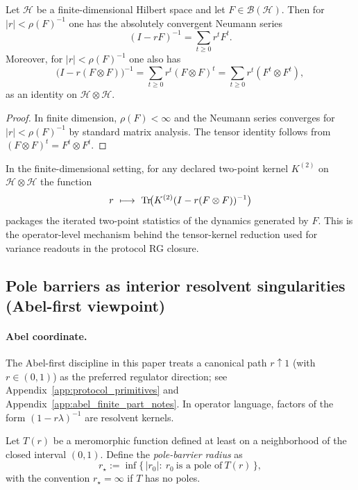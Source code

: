 \begin{lemma}\label{lem:tensor_resolvent_neumann}
\MathTag Let $\mathcal{H}$ be a finite-dimensional Hilbert space and let $F\in\mathcal{B}(\mathcal{H})$.
Then for $|r|<\rho(F)^{-1}$ one has the absolutely convergent Neumann series
\[
(I-rF)^{-1}=\sum_{t\ge 0} r^t F^t.
\]
Moreover, for $|r|<\rho(F)^{-1}$ one also has
\[
\bigl(I-r(F\otimes F)\bigr)^{-1}=\sum_{t\ge 0} r^t (F\otimes F)^t
=\sum_{t\ge 0} r^t (F^t\otimes F^t),
\]
as an identity on $\mathcal{H}\otimes\mathcal{H}$.
\end{lemma}
\begin{proof}
In finite dimension, $\rho(F)<\infty$ and the Neumann series converges for $|r|<\rho(F)^{-1}$ by standard matrix analysis.
The tensor identity follows from $(F\otimes F)^t=F^t\otimes F^t$.
\end{proof}

\begin{remark}\label{rem:two_point_resolvent_trace_readout}
\AuditTag In the finite-dimensional setting, for any declared two-point kernel $K^{(2)}$ on $\mathcal{H}\otimes\mathcal{H}$ the function
\[
r\ \longmapsto\ \Tr\!\bigl(K^{(2)}(I-r(F\otimes F))^{-1}\bigr)
\]
packages the iterated two-point statistics of the dynamics generated by $F$.
This is the operator-level mechanism behind the tensor-kernel reduction used for variance readouts in the protocol RG closure.
\end{remark}

\subsection{Pole barriers as interior resolvent singularities (Abel-first viewpoint)}
\label{subsec:operator_mother_space_pole_barrier}

\paragraph{Abel coordinate.}
\InterfaceTag The Abel-first discipline in this paper treats a canonical path $r\uparrow 1$ (with $r\in(0,1)$) as the preferred regulator direction; see Appendix~\ref{app:protocol_primitives} and Appendix~\ref{app:abel_finite_part_notes}.
In operator language, factors of the form $(1-r\lambda)^{-1}$ are resolvent kernels.

\begin{definition}\label{def:pole_barrier_radius_operator}
\MathTag Let $T(r)$ be a meromorphic function defined at least on a neighborhood of the closed interval $(0,1)$.
Define the \emph{pole-barrier radius} as
\[
r_\star:=\inf\{\,|r_0|:\ r_0\ \text{is a pole of}\ T(r)\,\},
\]
with the convention $r_\star=\infty$ if $T$ has no poles.
\end{definition}

